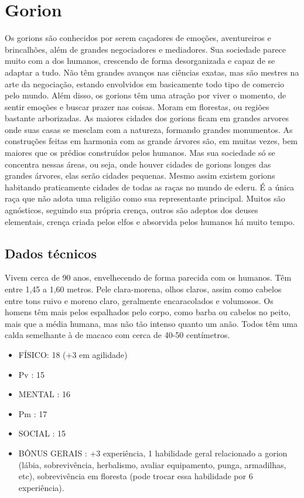 \section{Gorion}

Os gorions são conhecidos por serem caçadores de emoções, aventureiros e brincalhões, além de grandes negociadores e mediadores. Sua sociedade parece muito com a dos humanos, crescendo de forma desorganizada e capaz de se adaptar a tudo. Não têm grandes avanços nas ciências exatas, mas são mestres na arte da negociação, estando envolvidos em basicamente todo tipo de comercio pelo mundo. Além disso, os gorions têm uma atração por viver o momento, de sentir emoções e buscar prazer nas coisas. Moram em florestas, ou regiões bastante arborizadas. As maiores cidades dos gorions ficam em grandes arvores onde suas casas se mesclam com a natureza, formando grandes monumentos. As construções feitas em harmonia com as grande árvores são, em muitas vezes, bem maiores que os prédios construídos pelos humanos. Mas sua sociedade só se concentra nessas áreas, ou seja, onde houver cidades de gorions longes das grandes árvores, elas serão cidades pequenas. Mesmo assim existem gorions habitando praticamente cidades de todas as raças no mundo de ederu. É a única raça que não adota uma religião como sua representante principal. Muitos são agnósticos, seguindo sua própria crença, outros são adeptos dos deuses elementais, crença criada pelos elfos e absorvida pelos humanos há muito tempo.


\subsection{Dados técnicos}

Vivem cerca de 90 anos, envelhecendo de forma parecida com os humanos. Têm entre 1,45 a 1,60 metros. Pele clara-morena, olhos claros, assim como cabelos entre tons ruivo e moreno claro, geralmente encaracolados e volumosos. Os homens têm mais pelos espalhados pelo corpo, como barba ou cabelos no peito, mais que a média humana, mas não tão intenso quanto um anão. Todos têm uma calda semelhante à de macaco com cerca de 40-50 centímetros.

\begin{itemize}
	\item FÍSICO: 18 (+3 em agilidade)
	\item Pv : 15 

	\item MENTAL : 16
	\item Pm : 17 

	\item SOCIAL : 15

	\item BÔNUS GERAIS : +3 experiência, 1 habilidade geral relacionado a gorion (lábia, sobrevivência, herbalismo, avaliar equipamento, punga, armadilhas, etc), sobrevivência em floresta (pode trocar essa habilidade por 6 experiência).
\end{itemize}

